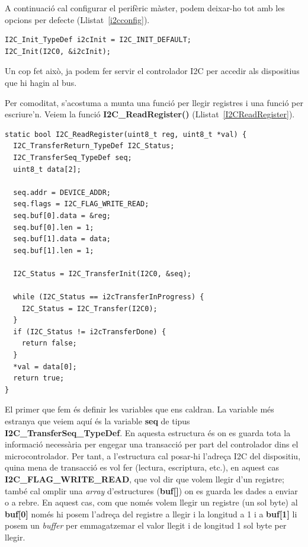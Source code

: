 A continuació cal configurar el perifèric màster, podem deixar-ho tot amb les opcions per defecte (Llistat~\ref{i2cconfig}).

\begin{lstlisting}[frame=single,style=customc,label=i2cconfig, caption={Inicialització del perifèric I2C}]
I2C_Init_TypeDef i2cInit = I2C_INIT_DEFAULT;
I2C_Init(I2C0, &i2cInit);
\end{lstlisting}

Un cop fet això, ja podem fer servir el controlador I2C per accedir als dispositius que hi hagin al bus.

Per comoditat, s'acostuma a munta una funció per llegir registres i una funció per escriure'n. Veiem la funció {\bf I2C\_ReadRegister()} (Llistat~\ref{I2CReadRegister}).
\begin{lstlisting}[style=customc,caption=Funció {\bf I2C\_ReadRegister},label=I2CReadRegister]
static bool I2C_ReadRegister(uint8_t reg, uint8_t *val) {
  I2C_TransferReturn_TypeDef I2C_Status;
  I2C_TransferSeq_TypeDef seq;
  uint8_t data[2];

  seq.addr = DEVICE_ADDR;
  seq.flags = I2C_FLAG_WRITE_READ;
  seq.buf[0].data = &reg;
  seq.buf[0].len = 1;
  seq.buf[1].data = data;
  seq.buf[1].len = 1;

  I2C_Status = I2C_TransferInit(I2C0, &seq);

  while (I2C_Status == i2cTransferInProgress) {
    I2C_Status = I2C_Transfer(I2C0);
  }
  if (I2C_Status != i2cTransferDone) {
    return false;
  }
  *val = data[0];
  return true;
}
\end{lstlisting}

El primer que fem és definir les variables que ens caldran. La variable més estranya que veiem aquí és la variable {\bf seq} de tipus {\bf I2C\_TransferSeq\_TypeDef}. En aquesta estructura és on es guarda tota la informació necessària per engegar una transacció per part del controlador dins el microcontrolador. Per tant, a l'estructura cal posar-hi l'adreça \gls{I2C} del dispositiu, quina mena de transacció es vol fer (lectura, escriptura, etc.), en aquest cas {\bf I2C\_FLAG\_WRITE\_READ}, que vol dir que volem llegir d'un registre; també cal omplir una {\em array} d'estructures ({\bf buf[]}) on es guarda les dades a enviar o a rebre. En aquest cas, com que només volem llegir un registre (un sol byte) al {\bf buf[0]} només hi posem l'adreça del registre a llegir i la longitud a 1 i a {\bf buf[1]} li posem un {\em buffer} per emmagatzemar el valor llegit i de longitud 1 sol byte per llegir.

